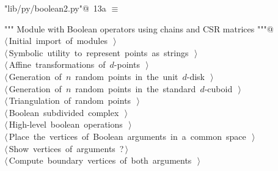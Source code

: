 \documentclass[11pt,oneside]{article}	%
\begin{document}
\begin{flushleft} \small
\begin{minipage}{\linewidth} \label{scrap22}
\protect{}\verb@"lib/py/boolean2.py"@\nobreak\ {\footnotesize 13a }$\equiv$
\vspace{-1ex}
\begin{list}{}{} \item
\mbox{}\verb@""" Module with Boolean operators using chains and CSR matrices """@\\
\mbox{}\verb@@\hbox{$\langle\,$Initial import of modules\nobreak\ {\footnotesize {}}$\,\rangle$}\verb@@\\
\mbox{}\verb@@\hbox{$\langle\,$Symbolic utility to represent points as strings\nobreak\ {\footnotesize {}}$\,\rangle$}\verb@@\\
\mbox{}\verb@@\hbox{$\langle\,$Affine transformations of $d$-points\nobreak\ {\footnotesize {}}$\,\rangle$}\verb@@\\
\mbox{}\verb@@\hbox{$\langle\,$Generation of $n$ random points in the unit $d$-disk\nobreak\ {\footnotesize {}}$\,\rangle$}\verb@@\\
\mbox{}\verb@@\hbox{$\langle\,$Generation of $n$ random points in the standard $d$-cuboid\nobreak\ {\footnotesize {}}$\,\rangle$}\verb@@\\
\mbox{}\verb@@\hbox{$\langle\,$Triangulation of random points\nobreak\ {\footnotesize {}}$\,\rangle$}\verb@@\\
\mbox{}\verb@@\hbox{$\langle\,$Boolean subdivided complex\nobreak\ {\footnotesize {}}$\,\rangle$}\verb@@\\
\mbox{}\verb@@\hbox{$\langle\,$High-level boolean operations\nobreak\ {\footnotesize {}}$\,\rangle$}\verb@@\\
\mbox{}\verb@@\hbox{$\langle\,$Place the vertices of Boolean arguments in a common space\nobreak\ {\footnotesize {}}$\,\rangle$}\verb@@\\
\mbox{}\verb@@\hbox{$\langle\,$Show vertices of arguments\nobreak\ {\footnotesize ?}$\,\rangle$}\verb@@\\
\mbox{}\verb@@\hbox{$\langle\,$Compute boundary vertices of both arguments\nobreak\ {\footnotesize {}}$\,\rangle$}\verb@@\\

\end{list}
\end{minipage}
\end{flushleft}
\end{document}
